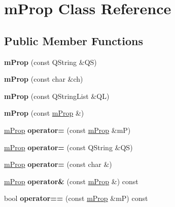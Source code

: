 \hypertarget{classm_prop}{}\section{m\+Prop Class Reference}
\label{classm_prop}
\subsection*{Public Member Functions}
\begin{DoxyCompactItemize}
\item 
\mbox{\label{classm_prop_a249af9e44512726cc83513a018d694a3}} 
{\bfseries m\+Prop} (const Q\+String \&QS)
\item 
\mbox{\label{classm_prop_a874d94ac1f8ef57ca3de846dd0bddef4}} 
{\bfseries m\+Prop} (const char \&ch)
\item 
\mbox{\label{classm_prop_a300e3536ca9dc26a92f5164a393967ed}} 
{\bfseries m\+Prop} (const Q\+String\+List \&QL)
\item 
\mbox{\label{classm_prop_a0e01ef0d38f5506b1bfc8c2d72d254c4}} 
{\bfseries m\+Prop} (const \hyperlink{classm_prop}{m\+Prop} \&)
\item 
\mbox{\label{classm_prop_a01c8a5d1c2732090a4393b69994ced63}} 
\hyperlink{classm_prop}{m\+Prop} {\bfseries operator=} (const \hyperlink{classm_prop}{m\+Prop} \&mP)
\item 
\mbox{\label{classm_prop_a8ce0d25070a4c7b9f98d382e1aea3c45}} 
\hyperlink{classm_prop}{m\+Prop} {\bfseries operator=} (const Q\+String \&QS)
\item 
\mbox{\label{classm_prop_a3bca8d7364dbf4feafe42f824858ef3e}} 
\hyperlink{classm_prop}{m\+Prop} {\bfseries operator=} (const char \&)
\item 
\mbox{\label{classm_prop_a5835e25ae701bd50b180e02c147f77b1}} 
\hyperlink{classm_prop}{m\+Prop} {\bfseries operator\&} (const \hyperlink{classm_prop}{m\+Prop} \&) const
\item 
\mbox{\label{classm_prop_a37d494f6ff70863100e300d68bda943c}} 
bool {\bfseries operator==} (const \hyperlink{classm_prop}{m\+Prop} \&mP) const

\end{DoxyCompactItemize}
